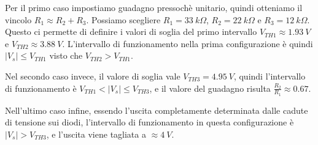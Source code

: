 Per il primo caso impostiamo guadagno pressochè unitario, quindi otteniamo il vincolo
$R_1\approx R_2+R_3$. Possiamo scegliere $R_1=33\ k\Omega$, $R_2=22\ k\Omega$ e $R_3=12\ k\Omega$.
Questo ci permette di definire i valori di soglia del primo intervallo $V_{TH1}\approx1.93\ V$
e $V_{TH2}\approx3.88\ V$. L'intervallo di funzionamento nella prima configurazione è quindi
$|V_s|\leq V_{TH1}$ visto che $V_{TH2}>V_{TH1}$.

Nel secondo caso invece, il valore di soglia vale $V_{TH3}=4.95\ V$, quindi l'intervallo di
funzionamento è $V_{TH1}<|V_s|\leq V_{TH3}$, e il valore del guadagno risulta
$\frac{R_2}{R_1}\approx0.67$.

Nell'ultimo caso infine, essendo l'uscita completamente determinata dalle cadute di tensione
sui diodi, l'intervallo di funzionamento in questa configurazione è $|V_s|>V_{TH3}$, e
l'uscita viene tagliata a $\approx4\ V$.

\begin{figure}[H]
    \centering
\end{figure}

